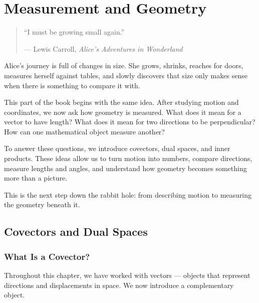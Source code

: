 \documentclass[11pt,openany]{book}
\theoremstyle{definition}
\begin{document}
\medskip

\part{Measurement and Geometry}
\vspace*{0.35\textheight}

\begin{quote}
\centering
``I must be growing small again.''

\medskip

--- Lewis Carroll, \textit{Alice's Adventures in Wonderland}
\end{quote}



Alice's journey is full of changes in size. She grows, shrinks, reaches for doors, 
measures herself against tables, and slowly discovers that size only makes sense when 
there is something to compare it with.

\medskip

This part of the book begins with the same idea. After studying motion and coordinates, 
we now ask how geometry is measured. What does it mean for a vector to have length? 
What does it mean for two directions to be perpendicular? How can one mathematical object 
measure another?

\medskip

To answer these questions, we introduce covectors, dual spaces, and inner products. These 
ideas allow us to turn motion into numbers, compare directions, measure lengths and 
angles, and understand how geometry becomes something more than a picture.

\medskip

This is the next step down the rabbit hole: from describing motion to measuring the 
geometry beneath it.

\chapter{Covectors and Dual Spaces}

\section{What Is a Covector?}

Throughout this chapter, we have worked with vectors --- objects that represent 
directions and displacements in space. We now introduce a complementary object.
\end{document}
